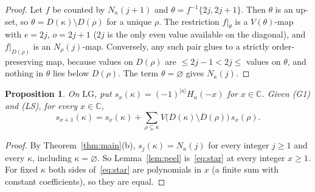 \documentclass[submission]{FPSAC2027}
\newtheorem{proposition}[theorem]{Proposition}
\theoremstyle{definition}
\theoremstyle{remark}
\newcommand{\LG}{\mathrm{LG}}
\newcommand{\C}{\mathbb{C}}
\begin{document}
\begin{proof}
Let $f$ be counted by $N_\kappa(j+1)$ and $\theta=f^{-1}\{2j,2j+1\}$. Then $\theta$ is an up-set,
so $\theta=D(\kappa)\setminus D(\rho)$ for a unique $\rho$. The restriction $f|_\theta$ is a
$V(\theta)$-map with $e=2j$, $o=2j+1$ ($2j$ is the only even value available on the diagonal),
and $f|_{D(\rho)}$ is an $N_\rho(j)$-map. Conversely, any such pair glues to a strictly
order-preserving map, because values on $D(\rho)$ are $\le2j-1<2j\le$ values on $\theta$, and
nothing in $\theta$ lies below $D(\rho)$. The term $\theta=\varnothing$ gives $N_\kappa(j)$.
\end{proof}

\begin{proposition}\label{prop:star}
On $\LG$, put $s_x(\kappa)=(-1)^{|\kappa|}H_\kappa(-x)$ for $x\in\C$. Given (G1) and (LS), for every
$x\in\C$,
\begin{equation}\label{eq:star}
s_{x+1}(\kappa)=s_x(\kappa)+\sum_{\rho\subsetneq\kappa}V\bigl(D(\kappa)\setminus D(\rho)\bigr)\,s_x(\rho).
\end{equation}
\end{proposition}

\begin{proof}
By Theorem~\ref{thm:main}(b), $s_j(\kappa)=N_\kappa(j)$ for every integer $j\ge1$ and every
$\kappa$, including $\kappa=\varnothing$. So Lemma~\ref{lem:peel} is~\eqref{eq:star} at every
integer $x\ge1$. For fixed $\kappa$ both sides of~\eqref{eq:star} are polynomials in $x$ (a finite
sum with constant coefficients), so they are equal.
\end{proof}
\end{document}
